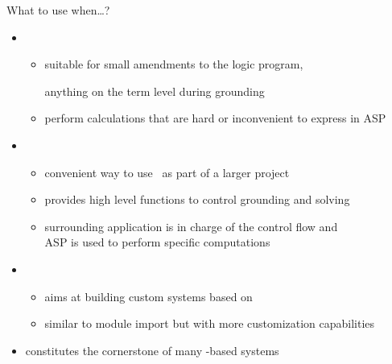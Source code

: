\begin{frame}{What to use when\dots?}
  \begin{itemize}
  \item {}

    \begin{itemize}
    \item suitable for small amendments to the logic program,

      anything on the term level during grounding

    \item perform calculations that are hard or inconvenient to express in ASP
    \end{itemize}
    \smallskip
  \item {}

    \begin{itemize}
    \item convenient way to use \clingo\ as part of a larger project
    \item provides high level functions to control grounding and solving
    \item surrounding application is in charge of the control flow and
      \\ ASP is used to perform specific computations
    \end{itemize}
    \smallskip
  \item {}

    \begin{itemize}
    \item aims at building custom systems based on \clingo
    \item similar to module import but with more customization capabilities
    \end{itemize}

  \item<2-> []\structure{\itarrow} constitutes the cornerstone of many \clingo-based systems

  \end{itemize}
\end{frame}
%
